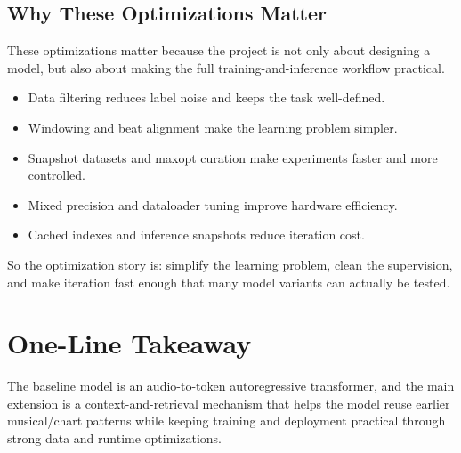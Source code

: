 \documentclass[11pt]{article}
\begin{document}
\subsection*{Why These Optimizations Matter}

These optimizations matter because the project is not only about designing a model, but also about making the full training-and-inference workflow practical.

\begin{itemize}[leftmargin=1.5em]
    \item Data filtering reduces label noise and keeps the task well-defined.
    \item Windowing and beat alignment make the learning problem simpler.
    \item Snapshot datasets and maxopt curation make experiments faster and more controlled.
    \item Mixed precision and dataloader tuning improve hardware efficiency.
    \item Cached indexes and inference snapshots reduce iteration cost.
\end{itemize}

So the optimization story is: simplify the learning problem, clean the supervision, and make iteration fast enough that many model variants can actually be tested.

\section*{One-Line Takeaway}

The baseline model is an audio-to-token autoregressive transformer, and the main extension is a context-and-retrieval mechanism that helps the model reuse earlier musical/chart patterns while keeping training and deployment practical through strong data and runtime optimizations.
\end{document}
